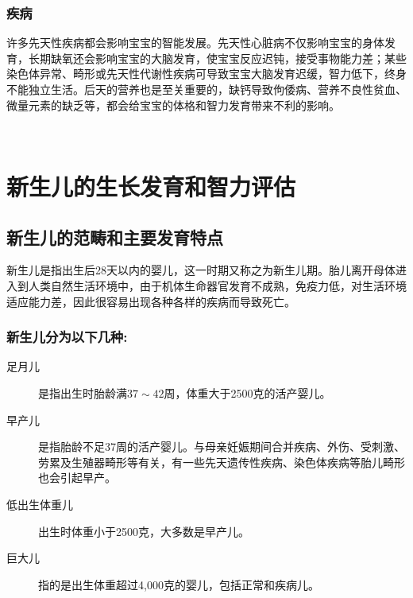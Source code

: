 \subsubsection{疾病}%

许多先天性疾病都会影响宝宝的智能发展。先天性心脏病不仅影响宝宝的身体发育，长期缺氧还会影响宝宝的大脑发育，使宝宝反应迟钝，接受事物能力差；某些染色体异常、畸形或先天性代谢性疾病可导致宝宝大脑发育迟缓，智力低下，终身不能独立生活。后天的营养也是至关重要的，缺钙导致佝倭病、营养不良性贫血、微量元素的缺乏等，都会给宝宝的体格和智力发育带来不利的影响。

‍%
\section{新生儿的生长发育和智力评估}

 
\subsection{新生儿的范畴和主要发育特点}

新生儿是指出生后28天以内的婴儿，这一时期又称之为新生儿期。胎儿离开母体进入到人类自然生活环境中，由于机体生命器官发育不成熟，免疫力低，对生活环境适应能力差，因此很容易出现各种各样的疾病而导致死亡。

\subsubsection{新生儿分为以下几种:}%


\begin{description}
\item[足月儿] 是指出生时胎龄满$37\sim{}42$周，体重大于2500克的活产婴儿。
\item[早产儿] 是指胎龄不足37周的活产婴儿。与母亲妊娠期间合并疾病、外伤、受刺激、劳累及生殖器畸形等有关，有一些先天遗传性疾病、染色体疾病等胎儿畸形也会引起早产。
\item[低出生体重儿] 出生时体重小于2500克，大多数是早产儿。
\item[巨大儿] 指的是出生体重超过4,000克的婴儿，包括正常和疾病儿。
\end{description}



